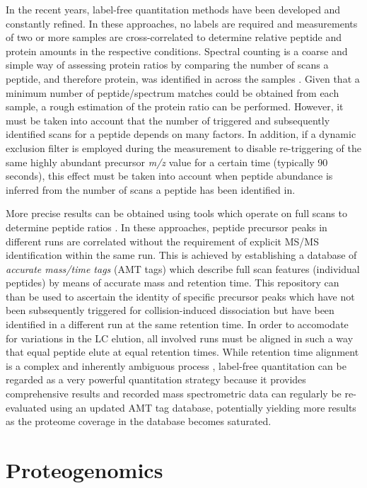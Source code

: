 In the recent years, label-free quantitation methods have been developed and
constantly refined.
In these approaches, no labels are required and measurements of two or 
more samples are cross-correlated to determine relative peptide and protein
amounts in the respective conditions.
Spectral counting is a coarse and simple way of assessing protein ratios by
comparing the number of scans a peptide, and therefore protein, was identified
in across the samples \citep{Old2005}.
Given that a minimum number of peptide/spectrum matches could be obtained from
each sample, a rough estimation of the protein ratio can be performed.
However, it must be taken into account that the number of triggered and
subsequently identified scans for a peptide depends on many factors.
In addition, if a dynamic exclusion filter is employed during the measurement 
to disable re-triggering of the same highly abundant precursor {\em m/z} value 
for a certain time (typically 90 seconds), this effect must be taken into 
account when peptide abundance is inferred from the number of scans a peptide
has been identified in.

More precise results can be obtained using tools which operate on full scans
to determine peptide ratios \citep{Mueller2007, Park2008}.
In these approaches, peptide precursor peaks in different runs are correlated 
without the requirement of explicit MS/MS identification within the same run.
This is achieved by establishing a database of {\em accurate mass/time tags} 
(AMT tags) which describe full scan features (individual peptides) by means
of accurate mass and retention time.
This repository can than be used to ascertain the identity of specific precursor
peaks which have not been subsequently triggered for collision-induced 
dissociation but have been identified in a different run at the same retention 
time.
In order to accomodate for variations in the LC elution, all involved runs
must be aligned in such a way that equal peptide elute at equal retention times.
While retention time alignment is a complex and inherently ambiguous process
\citep{Fischer2006}, label-free quantitation can be regarded as a very powerful
quantitation strategy because it provides comprehensive results and recorded 
mass spectrometric data can regularly be re-evaluated using an updated AMT tag 
database, potentially yielding more results as the proteome coverage in
the database becomes saturated.


\section{Proteogenomics}
\label{proteogenomics}

